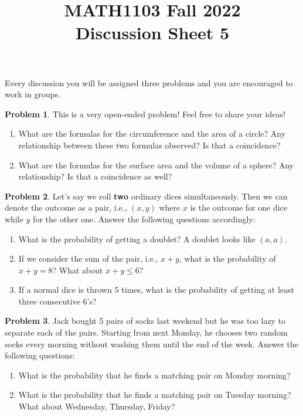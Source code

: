 \documentclass[11pt,oneside]{amsart}
\title{MATH1103 Fall 2022\\
Discussion Sheet 5}
\theoremstyle{definition}
\newtheorem{problem}{Problem}
\begin{document}
    \maketitle
    Every discussion you will be assigned three problems and you are encouraged to work in groups.

    \begin{problem} This is a very open-ended problem! Feel free to share your ideas!
        \begin{enumerate}
         \item What are the formulas for the circumference and the area of a circle? Any relationship between these two formulas observed? Is that a coincidence?
         \item What are the formulas for the surface area and the volume of a sphere? Any relationship? Is that a coincidence as well?
         
         \end{enumerate}
    \end{problem}

    \begin{problem}
       Let's say we roll \textbf{two} ordinary dices simultaneously. Then we can denote the outcome as a pair, i.e., $(x,y)$ where $x$ is the outcome for one dice while $y$ for the other one. Answer the following questions accordingly:
       \begin{enumerate}
           \item What is the probability of getting a doublet? A doublet looks like $(a,a)$.
           \item If we consider the sum of the pair, i.e., $x+y$, what is the probability of $x+y=8$? What about $x+y \leq 6$?
           \item If a normal dice is thrown $5$ times, what is the probability of getting at least three consecutive $6$'s?
       \end{enumerate}
       
       
       
    \end{problem}

    \begin{problem}
       Jack bought 5 pairs of socks last weekend but he was too lazy to separate each of the pairs. Starting from next Monday, he chooses two random socks every morning without washing them until the end of the week. Answer the following questions:
       \begin{enumerate}
           \item What is the probability that he finds a matching pair on Monday morning?
           \item What is the probability that he finds a matching pair on Tuesday morning? What about Wednesday, Thursday, Friday?
            
       \end{enumerate}
        
    \end{problem}
\end{document}
